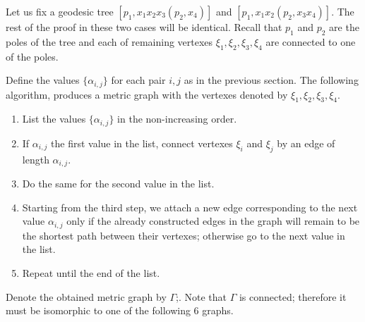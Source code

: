 Let us fix a geodesic tree $[p_1,x_1x_2x_3(p_2,x_4)]$ and $[p_1,x_1x_2(p_2,x_3x_4)]$.
The rest of the proof in these two cases will be identical.
Recall that $p_1$ and $p_2$ are the poles of the tree and each of remaining vertexes $\xi_1,\xi_2, \xi_3,\xi_4$ are connected to one of the poles.

Define the values $\{\alpha_{i,j}\}$ for each pair $i,j$ as in the previous section.
The following algorithm, produces a metric graph with the vertexes denoted by $\xi_1,\xi_2, \xi_3,\xi_4$.
\begin{enumerate}[1.]
\item List the values $\{\alpha_{i,j}\}$ in the non-increasing order.
\item If $\alpha_{i,j}$ the first value in the list, connect vertexes $\xi_i$ and $\xi_j$ by an edge of length $\alpha_{i,j}$.
\item Do the same for the second value  in the list.
\item Starting from the third step, we attach a new edge corresponding to the next value $\alpha_{i,j}$ only if the already constructed edges in the graph will remain to be the shortest path between their vertexes; otherwise go to the next value in the list. 
\item Repeat until the end of the list.
\end{enumerate}
Denote the obtained metric graph by $\Gamma$;.
Note that $\Gamma$ is connected;
therefore it must be isomorphic to one of the following 6 graphs.

